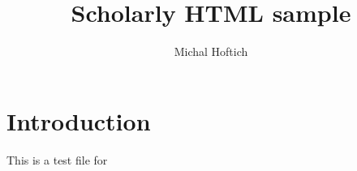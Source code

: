 \documentclass{article}
\title{Scholarly HTML sample}
\author{Michal Hoftich}
\begin{document}
\maketitle
\tableofcontents

\section{Introduction}

This is a test file for \cite{scholarly}

\printbibliography
\end{document}
